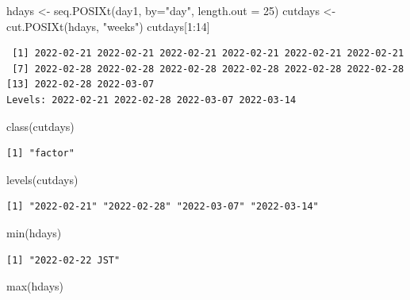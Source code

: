 \documentclass[
  letterpaper,
  DIV=11,
  numbers=noendperiod]{scrreprt}
\newenvironment{Shaded}{\begin{snugshade}}{\end{snugshade}}
\newcommand{\AttributeTok}[1]{\textcolor[rgb]{0.40,0.45,0.13}{#1}}
\newcommand{\DecValTok}[1]{\textcolor[rgb]{0.68,0.00,0.00}{#1}}
\newcommand{\FunctionTok}[1]{\textcolor[rgb]{0.28,0.35,0.67}{#1}}
\newcommand{\NormalTok}[1]{\textcolor[rgb]{0.00,0.23,0.31}{#1}}
\newcommand{\OtherTok}[1]{\textcolor[rgb]{0.00,0.23,0.31}{#1}}
\newcommand{\SpecialCharTok}[1]{\textcolor[rgb]{0.37,0.37,0.37}{#1}}
\newcommand{\StringTok}[1]{\textcolor[rgb]{0.13,0.47,0.30}{#1}}
\begin{document}
\begin{Shaded}
\begin{Highlighting}[]
\NormalTok{hdays }\OtherTok{\textless{}{-}} \FunctionTok{seq.POSIXt}\NormalTok{(day1, }\AttributeTok{by=}\StringTok{"day"}\NormalTok{, }\AttributeTok{length.out =} \DecValTok{25}\NormalTok{)}
\NormalTok{cutdays }\OtherTok{\textless{}{-}} \FunctionTok{cut.POSIXt}\NormalTok{(hdays, }\StringTok{"weeks"}\NormalTok{)}
\NormalTok{cutdays[}\DecValTok{1}\SpecialCharTok{:}\DecValTok{14}\NormalTok{]}
\end{Highlighting}
\end{Shaded}

\begin{verbatim}
 [1] 2022-02-21 2022-02-21 2022-02-21 2022-02-21 2022-02-21 2022-02-21
 [7] 2022-02-28 2022-02-28 2022-02-28 2022-02-28 2022-02-28 2022-02-28
[13] 2022-02-28 2022-03-07
Levels: 2022-02-21 2022-02-28 2022-03-07 2022-03-14
\end{verbatim}

\begin{Shaded}
\begin{Highlighting}[]
\FunctionTok{class}\NormalTok{(cutdays)}
\end{Highlighting}
\end{Shaded}

\begin{verbatim}
[1] "factor"
\end{verbatim}

\begin{Shaded}
\begin{Highlighting}[]
\FunctionTok{levels}\NormalTok{(cutdays)}
\end{Highlighting}
\end{Shaded}

\begin{verbatim}
[1] "2022-02-21" "2022-02-28" "2022-03-07" "2022-03-14"
\end{verbatim}

\begin{Shaded}
\begin{Highlighting}[]
\FunctionTok{min}\NormalTok{(hdays)}
\end{Highlighting}
\end{Shaded}

\begin{verbatim}
[1] "2022-02-22 JST"
\end{verbatim}

\begin{Shaded}
\begin{Highlighting}[]
\FunctionTok{max}\NormalTok{(hdays)}
\end{Highlighting}
\end{Shaded}
\end{document}
